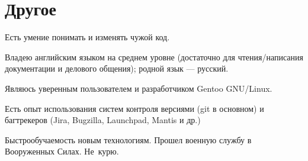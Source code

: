 \section{Другое}
Есть умение понимать и изменять чужой код.

Владею английским языком на среднем уровне (достаточно для чтения/написания
документации и делового общения); родной язык --- русский.

Являюсь уверенным пользователем и разработчиком Gentoo GNU/Linux.

Есть опыт использования систем контроля версиями (git в основном) и
багтрекеров (Jira, Bugzilla, Launchpad, Mantis и др.)

Быстрообучаемость новым технологиям.
Прошел военную службу в Вооруженных Силах.
Не~курю.

